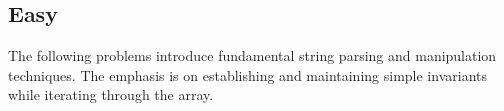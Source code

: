 \subsection{Easy}

The following problems introduce fundamental string parsing and manipulation techniques.
The emphasis is on establishing and maintaining simple invariants while
iterating through the array.



% 
% 
